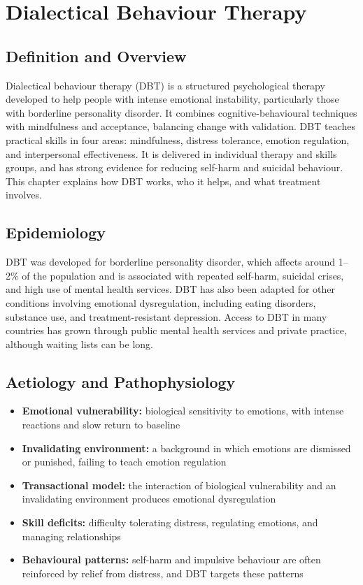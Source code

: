 \chapter{Dialectical Behaviour Therapy}

\section*{Definition and Overview}
Dialectical behaviour therapy (DBT) is a structured psychological therapy developed to help people with intense emotional instability, particularly those with borderline personality disorder. It combines cognitive-behavioural techniques with mindfulness and acceptance, balancing change with validation. DBT teaches practical skills in four areas: mindfulness, distress tolerance, emotion regulation, and interpersonal effectiveness. It is delivered in individual therapy and skills groups, and has strong evidence for reducing self-harm and suicidal behaviour. This chapter explains how DBT works, who it helps, and what treatment involves.

\section*{Epidemiology}
DBT was developed for borderline personality disorder, which affects around 1--2\% of the population and is associated with repeated self-harm, suicidal crises, and high use of mental health services. DBT has also been adapted for other conditions involving emotional dysregulation, including eating disorders, substance use, and treatment-resistant depression. Access to DBT in many countries has grown through public mental health services and private practice, although waiting lists can be long.

\section*{Aetiology and Pathophysiology}
\begin{itemize}
    \item \textbf{Emotional vulnerability:} biological sensitivity to emotions, with intense reactions and slow return to baseline
    \item \textbf{Invalidating environment:} a background in which emotions are dismissed or punished, failing to teach emotion regulation
    \item \textbf{Transactional model:} the interaction of biological vulnerability and an invalidating environment produces emotional dysregulation
    \item \textbf{Skill deficits:} difficulty tolerating distress, regulating emotions, and managing relationships
    \item \textbf{Behavioural patterns:} self-harm and impulsive behaviour are often reinforced by relief from distress, and DBT targets these patterns
\end{itemize}

